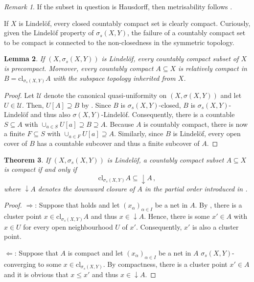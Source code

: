 \documentclass[
	paper=A4,
	pagesize=auto,
	fontsize=12pt
]{scrartcl}
\theoremstyle{plain}
\newtheorem{theorem}{Theorem}[section]
\newtheorem{lemma}[theorem]{Lemma}
\theoremstyle{remark}
\newtheorem{remark}[theorem]{Remark}
\theoremstyle{definition}
\begin{document}
%
\begin{remark}
\label{rem:HausdorffSubsetAndSeparableDualImpliesMetrisability}
If the subset in question is Hausdorff, then metrisability follows \cite[Theorem 3.1.19]{src:Engelking:GeneralTopology}.
\end{remark}
%
If $X$ is Lindelöf, every closed countably compact set is clearly compact.
Curiously, given the Lindelöf property of $\sigma_s(X, Y)$, the failure of a countably compact set to be compact is connected to the non-closedness in the symmetric topology.
%
\begin{lemma}
\label{lem:CountableCompactnessImpliesRelativeCompactnessInSymmetricClosure}
If $(X, \sigma_s(X, Y))$ is Lindelöf, every countably compact subset of $X$ is precompact.
Moreover, every countably compact $A \subseteq X$ is relatively compact in $B = \mathrm{cl}_{\sigma_s(X, Y)} A$ with the subspace topology inherited from $X$.
\end{lemma}
\begin{proof}
Let $\mathcal{U}$ denote the canonical quasi-uniformity on $(X, \sigma(X, Y))$ and let $U \in \mathcal{U}$.
Then, $U[A] \supseteq B$ by .
Since $B$ is $\sigma_s(X, Y)$-closed, $B$ is $\sigma_s(X, Y)$-Lindelöf and thus also $\sigma(X, Y)$-Lindelöf.
Consequently, there is a countable $S \subseteq A$ with $\cup_{a \in S} U[a] \supseteq B \supseteq A$.
Because $A$ is countably compact, there is now a finite $F \subseteq S$ with $\cup_{a \in F} U[a] \supseteq A$.
Similarly, since $B$ is Lindelöf, every open cover of $B$ has a countable subcover and thus a finite subcover of $A$.
\end{proof}
%
\begin{theorem}
\label{thm:LindelöfCompactnessCondition}
If $(X, \sigma_s(X, Y))$ is Lindelöf, a countably compact subset $A \subseteq X$ is compact if and only if
%
\begin{equation}
\label{eq:SymmetricClosureContainedInDOwnwardClosure}
\mathrm{cl}_{\sigma_s(X, Y)} A \subseteq \downarrow A \, ,
\end{equation}
%
where $\downarrow A$ denotes the downward closure of $A$ in the partial order introduced in .
\end{theorem}
\begin{proof}
$\Rightarrow$:
Suppose that  holds and let $(x_\alpha)_{\alpha \in I}$ be a net in $A$.
By , there is a cluster point $x \in \mathrm{cl}_{\sigma_s(X, Y)} A$ and thus $x \in \downarrow A$.
Hence, there is some $x' \in A$ with $x \in U$ for every open neighbourhood $U$ of $x'$.
Consequently, $x'$ is also a cluster point.

$\Leftarrow$:
Suppose that $A$ is compact and let $(x_\alpha)_{\alpha \in I}$ be a net in $A$ $\sigma_s(X, Y)$-converging to some $x \in \mathrm{cl}_{\sigma_s(X, Y)}$.
By compactness, there is a cluster point $x' \in A$ and it is obvious that $x \le x'$ and thus $x \in \downarrow A$.
\end{proof}
\end{document}

